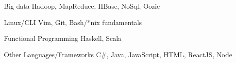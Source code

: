 

\begin{cvskills}

  \cvskill
    {Big-data}
    {Hadoop, MapReduce, HBase, NoSql, Oozie}

  \cvskill
    {Linux/CLI}
    {Vim, Git, Bash/*nix fundamentals}

  \cvskill
    {Functional Programming}
    {Haskell, Scala}

  \cvskill
    {Other Languages/Frameworks}
    {C\#, Java, JavaScript, HTML, ReactJS, Node}

\end{cvskills}
